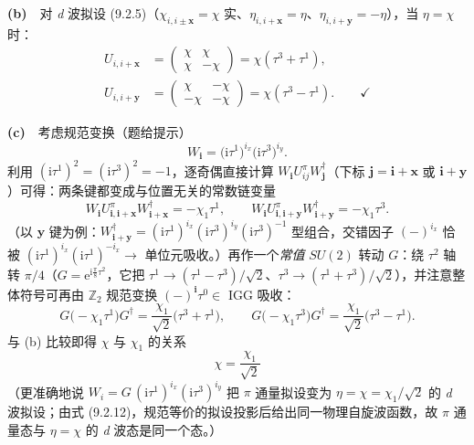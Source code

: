 \textbf{(b)}　对 \emph{d} 波拟设 (9.2.5)（$\chi_{i,i\pm\pmb{x}}=\chi$ 实、$\eta_{i,i+\pmb{x}}=\eta$、$\eta_{i,i+\pmb{y}}=-\eta$），当 $\eta=\chi$ 时：
\begin{align*}
U_{i,i+\pmb{x}}&=\begin{pmatrix}\chi&\chi\\ \chi&-\chi\end{pmatrix}=\chi(\tau^{3}+\tau^{1}) ,\\
U_{i,i+\pmb{y}}&=\begin{pmatrix}\chi&-\chi\\ -\chi&-\chi\end{pmatrix}=\chi(\tau^{3}-\tau^{1}) .\qquad\checkmark
\end{align*}

\textbf{(c)}　考虑规范变换（题给提示）
\begin{equation*}
W_{\pmb{i}}=\big(\mathrm{i}\tau^{1}\big)^{i_x}\big(\mathrm{i}\tau^{3}\big)^{i_y} .
\end{equation*}
利用 $(\mathrm{i}\tau^{1})^{2}=(\mathrm{i}\tau^{3})^{2}=-1$，逐奇偶直接计算 $W_{\pmb{i}}U^{\pi}_{ij}W^{\dagger}_{\pmb{j}}$（下标 $\pmb{j}=\pmb{i}+\pmb{x}$ 或 $\pmb{i}+\pmb{y}$）可得：两条键都变成与位置无关的常数链变量
\begin{equation*}
W_{\pmb{i}}U^{\pi}_{\pmb{i},\pmb{i}+\pmb{x}}W^{\dagger}_{\pmb{i}+\pmb{x}}=-\chi_1\tau^{1},\qquad
W_{\pmb{i}}U^{\pi}_{\pmb{i},\pmb{i}+\pmb{y}}W^{\dagger}_{\pmb{i}+\pmb{y}}=-\chi_1\tau^{3} .
\end{equation*}
（以 $\pmb{y}$ 键为例：$W_{\pmb{i}+\pmb{y}}^{\dagger}=(\mathrm{i}\tau^{1})^{i_x}(\mathrm{i}\tau^{3})^{i_y}(\mathrm{i}\tau^{3})^{-1}$ 型组合，交错因子 $(-)^{i_x}$ 恰被 $(\mathrm{i}\tau^{1})^{i_x}(\mathrm{i}\tau^{1})^{-i_x}\to$ 单位元吸收。）再作一个\emph{常值} $SU(2)$ 转动 $G$：绕 $\tau^{2}$ 轴转 $\pi/4$（$G=\mathrm{e}^{\mathrm{i}\frac{\pi}{8}\tau^{2}}$，它把 $\tau^{1}\to(\tau^{1}-\tau^{3})/\sqrt2$、$\tau^{3}\to(\tau^{1}+\tau^{3})/\sqrt2$），并注意整体符号可再由 $\mathbb{Z}_2$ 规范变换 $(-)^{\pmb{i}}\tau^0\in$ IGG 吸收：
\begin{equation*}
G\big(-\chi_1\tau^{1}\big)G^{\dagger}=\frac{\chi_1}{\sqrt2}\big(\tau^{3}+\tau^{1}\big),\qquad
G\big(-\chi_1\tau^{3}\big)G^{\dagger}=\frac{\chi_1}{\sqrt2}\big(\tau^{3}-\tau^{1}\big) .
\end{equation*}
与 (b) 比较即得 $\chi$ 与 $\chi_1$ 的关系
\begin{equation*}
\boxed{\;\chi=\frac{\chi_1}{\sqrt{2}}\;}
\end{equation*}
（更准确地说 $W_i=G\,(\mathrm{i}\tau^{1})^{i_x}(\mathrm{i}\tau^{3})^{i_y}$ 把 $\pi$ 通量拟设变为 $\eta=\chi=\chi_1/\sqrt2$ 的 \emph{d} 波拟设；由式 (9.2.12)，规范等价的拟设投影后给出同一物理自旋波函数，故 $\pi$ 通量态与 $\eta=\chi$ 的 \emph{d} 波态是同一个态。）

